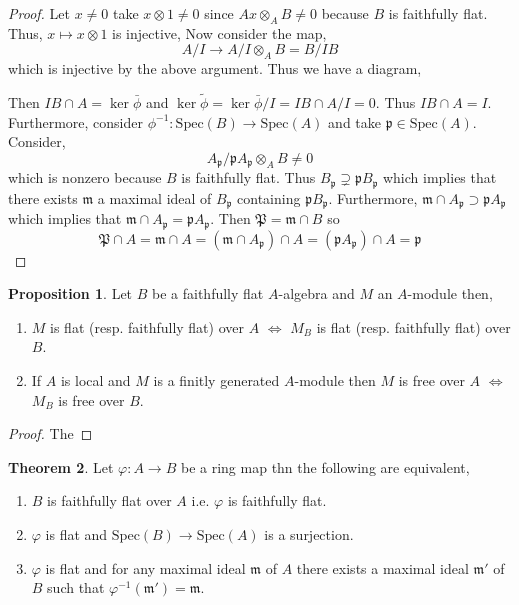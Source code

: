 \documentclass[12pt]{article}
\newcommand{\spec}[1]{\mathrm{Spec}\left( #1 \right)}
\newcommand{\p}{\mathfrak{p}}
\newcommand{\m}{\mathfrak{m}}
\theoremstyle{remark}
\theoremstyle{definition}
\newtheorem{theorem}{Theorem}[section]
\newtheorem{proposition}[theorem]{Proposition}
\begin{document}
\begin{proof}
Let $x \neq 0$ take $x \otimes 1 \neq 0$ since $A x \otimes_A B \neq 0$ because $B$ is faithfully flat. Thus, $x \mapsto x \otimes 1$ is injective, Now consider the map,
\[ A / I \to A / I \otimes_A B = B / IB \]
which is injective by the above argument. Thus we have a diagram,
\begin{center}
\end{center}
Then $IB \cap A = \ker{ \bar{\phi}}$ and $\ker{\tilde{\phi}} = \ker{\bar{\phi}} / I = IB \cap A / I = 0$. Thus $I B \cap A = I$. 
Furthermore, consider $\phi^{-1} : \spec{B} \to \spec{A}$ and take $\p \in \spec{A}$. Consider,
\[ A_\p / \p A_\p \otimes_A B \neq 0 \]
which is nonzero because $B$ is faithfully flat. Thus $B_\p \supsetneq \p B_\p$ which implies that there exists $\m$ a maximal ideal of $B_\p$ containing $\p B_\p$. Furthermore, $\m \cap A_\p \supset \p A_\p$ which implies that $\m \cap A_\p = \p A_\p$. Then $\mathfrak{P} = \m \cap B$ so 
\[ \mathfrak{P} \cap A = \m \cap A = (\m \cap A_\p) \cap A = (\p A_\p) \cap A = \p \]
\end{proof}

\begin{proposition}
Let $B$ be a faithfully flat $A$-algebra and $M$ an $A$-module then,
\begin{enumerate}
\item $M$ is flat (resp. faithfully flat) over $A$ $\iff$ $M_B$ is flat (resp. faithfully flat) over $B$.
\item If $A$ is local and $M$ is a finitly generated $A$-module then $M$ is free over $A$ $\iff$ $M_B$ is free over $B$.   
\end{enumerate}
\end{proposition}

\begin{proof}
The 
\end{proof}

\begin{theorem}
Let $\varphi : A \to B$ be a ring map thn the following are equivalent,
\begin{enumerate}
\item $B$ is faithfully flat over $A$ i.e. $\varphi$ is faithfully flat.

\item $\varphi$ is flat and $\spec{B} \to \spec{A}$ is a surjection.

\item $\varphi$ is flat and for any maximal ideal $\m$ of $A$ there exists a maximal ideal $\m'$ of $B$ such that $\varphi^{-1}(\m') = \m$.
\end{enumerate}
\end{theorem}
\end{document}
